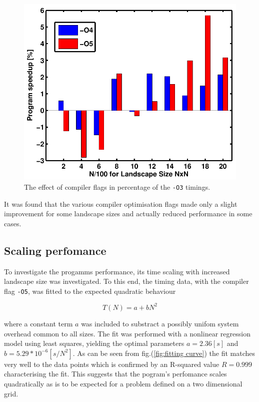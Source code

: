 \begin{figure}
\begin{center}
 \includegraphics[scale=0.8]{Figures/Timing_Barchart_compflags.pdf}
\caption{The effect of compiler flags in percentage of the \texttt{-O3} timings.}
\label{fig: Comp flags bahart}
\end{center}
\end{figure}

It was found that the various compiler optimisation flags made only a slight improvement for some landscape sizes and actually reduced performance in some cases.


\subsection{Scaling perfomance}
\label{subsec:scaling pefomance}

To investigate the progamms performance, its time scaling with increased landscape size was investigated.
To this end, the timing data, with the compiler flag  \texttt{-O5}, was fitted to the expected quadratic behaviour

\begin{equation}
 T(N)=a+bN^2
\label{eq:fitting curve}
\end{equation}

where a constant term $a$ was included to substract a possibly unifom system overhead common to all sizes.
The fit was performed with a nonlinear regression model using least squares, yielding the optimal parameters $a=2.36 [s]$ and $b=5.29*10^{-6} [s/N^2]$.
As can be seen from fig.(\ref{fig:fitting curve}) the fit matches very well to the data points which is confirmed by an R-squared value $R=0.999$ characterising the fit.
This suggests that the pogram's perfomance scales quadratically as is to be expected for a problem defined on a two dimensional grid.

